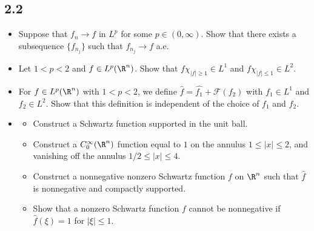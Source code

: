 \subsection*{2.2}
\begin{itemize}
    \item[1.]Suppose that $f_n\to f$ in $L^p$ for some $p\in(0,\infty)$.
    Show that there exists a subsequence $\{f_{n_j}\}$ such that $f_{n_j}\to f$ a.e.

    \item[2.]Let $1<p<2$ and $f\in L^p(\R^n)$. Show that $f\chi_{|f|\ge1}\in L^1$ 
    and $f\chi_{|f|\le1}\in L^2$.

    \item[3.]For $f\in L^p(\R^n)$ with $1<p<2$, we define $\hat{f}=\hat{f_1}+\mathcal{F}(f_2)$ 
    with $f_1\in L^1$ and $f_2\in L^2$. Show that this definition is independent 
    of the choice of $f_1$ and $f_2$.
    
    \item[4.]\begin{itemize}
        \item[(i)]Construct a Schwartz function supported in the unit ball.

        \item[(ii)]Construct a $C_0^\infty(\R^n)$ function equal to $1$ 
        on the annulus $1\le|x|\le2$, and vanishing off the annulus $1/2\le|x|\le4$.

        \item[(iii)]Construct a nonnegative nonzero Schwartz function $f$ on $\R^n$ 
        such that $\hat{f}$ is nonnegative and compactly supported.

        \item[(iv)]Show that a nonzero Schwartz function $f$ cannot be 
        nonnegative if $\hat{f}(\xi)=1$ for $|\xi|\le1$.
    \end{itemize}
\end{itemize}
